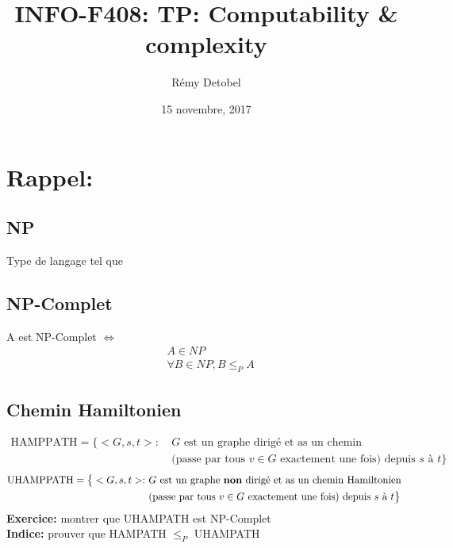 \documentclass[a4paper,12pt]{article}
\title{INFO-F408: TP: Computability \& complexity}
\date{15 novembre, 2017}
\author{Rémy Detobel}
\begin{document}
\maketitle
\newpage

\section{Rappel:}

  \subsection{NP}
    Type de langage tel que 
    
  \subsection{NP-Complet}
    A est NP-Complet $\Leftrightarrow$
    \begin{align}
      &A \in NP\\
      &\forall B \in NP, B \leq_P A
    \end{align}

  \subsection{Chemin Hamiltonien}
    \begin{align*}
      \text{HAMPPATH} = \big\{<G, s, t>:\ &G \text{ est un graphe dirigé et as un chemin Hamiltonien }\\
      &\text{(passe par tous } v \in G\text{ exactement une fois) depuis } s \text{ à } t \big\}
    \end{align*}
    \begin{align*}
      \text{UHAMPPATH} = \big\{<G, s, t>:\ &G \text{ est un graphe \textbf{non} dirigé et as un chemin Hamiltonien }\\
      &\text{(passe par tous } v \in G\text{ exactement une fois) depuis } s \text{ à } t \big\}
    \end{align*}
    \textbf{Exercice:} montrer que UHAMPATH est NP-Complet\\
    \textbf{Indice:} prouver que HAMPATH $\leq_P$ UHAMPATH
    
\end{document}
